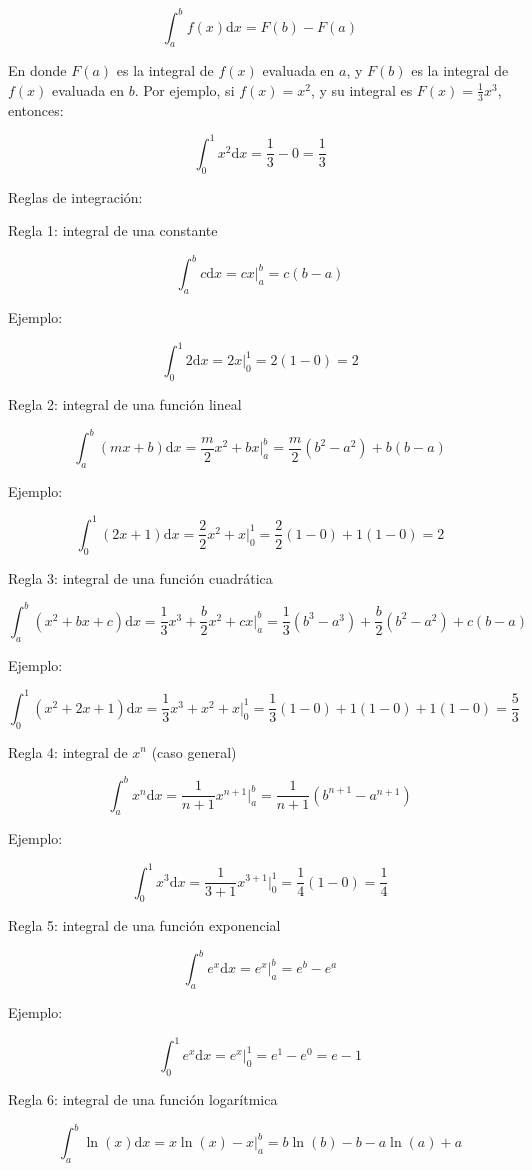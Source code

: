 \documentclass[11pt]{article}
\begin{document}
\[
\int_a^b f(x) \text{d}x = F(b) - F(a)
\]

En donde \(F(a)\) es la integral de \(f(x)\) evaluada en \(a\), y
\(F(b)\) es la integral de \(f(x)\) evaluada en \(b\). Por ejemplo, si
\(f(x) = x^2\), y su integral es \(F(x) = \frac{1}{3}x^3\), entonces:

\[
\int_0^1 x^2 \text{d}x = \frac{1}{3} - 0 = \frac{1}{3}
\]

Reglas de integración:

Regla 1: integral de una constante

\[
\int_a^b c \text{d}x = cx \Big|_a^b = c(b-a)
\]

Ejemplo:

\[
\int_0^1 2 \text{d}x = 2x \Big|_0^1 = 2(1-0) = 2
\]

Regla 2: integral de una función lineal

\[
\int_a^b (mx + b) \text{d}x = \frac{m}{2}x^2 + bx \Big|_a^b = \frac{m}{2}(b^2 - a^2) + b(b-a)
\]

Ejemplo:

\[
\int_0^1 (2x + 1) \text{d}x = \frac{2}{2}x^2 + x \Big|_0^1 = \frac{2}{2}(1-0) + 1(1-0) = 2
\]

Regla 3: integral de una función cuadrática

\[
\int_a^b (x^2 + bx + c) \text{d}x = \frac{1}{3}x^3 + \frac{b}{2}x^2 + cx \Big|_a^b = \frac{1}{3}(b^3 - a^3) + \frac{b}{2}(b^2 - a^2) + c(b-a)
\]

Ejemplo:

\[
\int_0^1 (x^2 + 2x + 1) \text{d}x = \frac{1}{3}x^3 + x^2 + x \Big|_0^1 = \frac{1}{3}(1-0) + 1(1-0) + 1(1-0) = \frac{5}{3}
\]

Regla 4: integral de \(x^n\) (caso general)

\[
\int_a^b x^n \text{d}x = \frac{1}{n+1}x^{n+1} \Big|_a^b = \frac{1}{n+1}(b^{n+1} - a^{n+1})
\]

Ejemplo:

\[
\int_0^1 x^3 \text{d}x = \frac{1}{3+1}x^{3+1} \Big|_0^1 = \frac{1}{4}(1-0) = \frac{1}{4}
\]

Regla 5: integral de una función exponencial

\[
\int_a^b e^x \text{d}x = e^x \Big|_a^b = e^b - e^a
\]

Ejemplo:

\[
\int_0^1 e^x \text{d}x = e^x \Big|_0^1 = e^1 - e^0 = e - 1
\]

Regla 6: integral de una función logarítmica

\[
\int_a^b \ln(x) \text{d}x = x\ln(x) - x \Big|_a^b = b\ln(b) - b - a\ln(a) + a
\]
\end{document}

